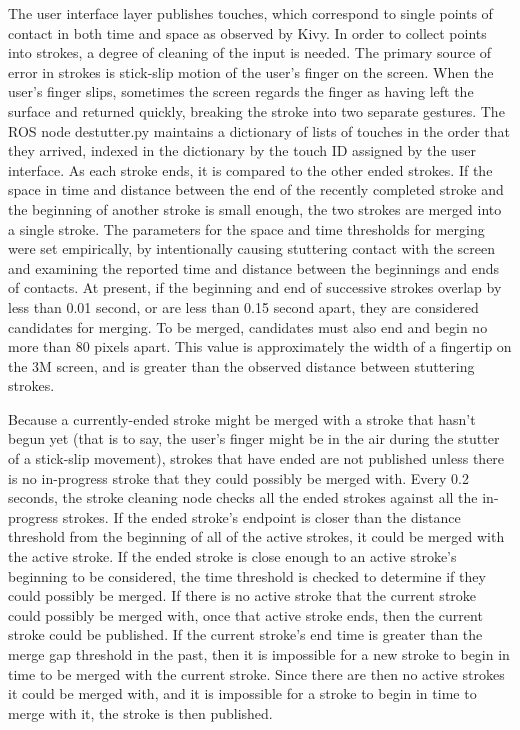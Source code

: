 The user interface layer publishes touches, which correspond to single points of contact in both time and space as observed by Kivy. 
In order to collect points into strokes, a degree of cleaning of the input is needed. 
The primary source of error in strokes is stick-slip motion of the user's finger on the screen. 
When the user's finger slips, sometimes the screen regards the finger as having left the surface and returned quickly, breaking the stroke into two separate gestures. 
The ROS node destutter.py maintains a dictionary of lists of touches in the order that they arrived, indexed in the dictionary by the touch ID assigned by the user interface. 
As each stroke ends, it is compared to the other ended strokes. 
If the space in time and distance between the end of the recently completed stroke and the beginning of another stroke is small enough, the two strokes are merged into a single stroke. 
The parameters for the space and time thresholds for merging were set empirically, by intentionally causing stuttering contact with the screen and examining the reported time and distance between the beginnings and ends of contacts. 
At present, if the beginning and end of successive strokes overlap by less than 0.01 second, or are less than 0.15 second apart, they are considered candidates for merging. 
To be merged, candidates must also end and begin no more than 80 pixels apart. 
This value is approximately the width of a fingertip on the 3M screen, and is greater than the observed distance between stuttering strokes. 

Because a currently-ended stroke might be merged with a stroke that hasn't begun yet (that is to say, the user's finger might be in the air during the stutter of a stick-slip movement), strokes that have ended are not published unless there is no in-progress stroke that they could possibly be merged with. 
Every 0.2 seconds, the stroke cleaning node checks all the ended strokes against all the in-progress strokes. 
If the ended stroke's endpoint is closer than the distance threshold from the beginning of all of the active strokes, it could be merged with the active stroke. 
If the ended stroke is close enough to an active stroke's beginning to be considered, the time threshold is checked to determine if they could possibly be merged. 
If there is no active stroke that the current stroke could possibly be merged with, once that active stroke ends, then the current stroke could be published.
If the current stroke's end time is greater than the merge gap threshold in the past, then it is impossible for a new stroke to begin in time to be merged with the current stroke. 
Since there are then no active strokes it could be merged with, and it is impossible for a stroke to begin in time to merge with it, the stroke is then published. 

